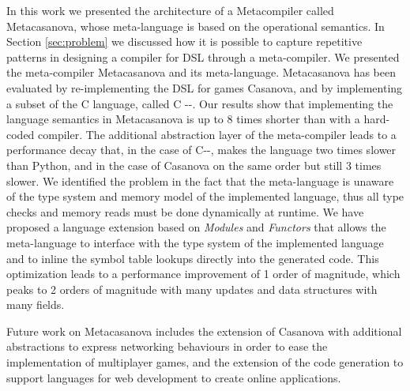 In this work we presented the architecture of a Metacompiler called Metacasanova, whose meta-language is based on the operational semantics. In Section \ref{sec:problem} we discussed how it is possible to capture repetitive patterns in designing a compiler for DSL through a meta-compiler. We presented the meta-compiler Metacasanova and its meta-language. Metacasanova has been evaluated by re-implementing the DSL for games Casanova, and by implementing a subset of the C language, called C -{}-. Our results show that implementing the language semantics in Metacasanova is up to 8 times shorter than with a hard-coded compiler. The additional abstraction layer of the meta-compiler leads to a performance decay that, in the case of C-{}-, makes the language two times slower than Python, and in the case of Casanova on the same order but still 3 times slower. We identified the problem in the fact that the meta-language is unaware of the type system and memory model of the implemented language, thus all type checks and memory reads must be done dynamically at runtime. We have proposed a language extension based on \textit{Modules} and \textit{Functors} that allows the meta-language to interface with the type system of the implemented language and to inline the symbol table lookups directly into the generated code. This optimization leads to a performance improvement of 1 order of magnitude, which peaks to 2 orders of magnitude with many updates and data structures with many fields. 

Future work on Metacasanova includes the extension of Casanova with additional abstractions to express networking behaviours in order to ease the implementation of multiplayer games, and the extension of the code generation to support languages for web development to create online applications.